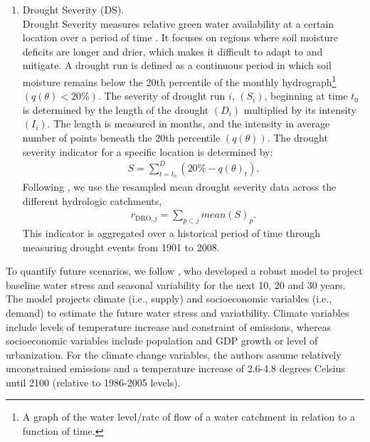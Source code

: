 \documentclass[a4paper]{article}
\begin{document}
\begin{enumerate}
\item Drought Severity (DS).\\
Drought Severity measures relative green water availability at a certain location over a period of time \citep{Schyns:2015}.
It focuses on regions where soil moisture deficits are longer and drier, which makes it difficult to adapt to and mitigate. 
A drought run is defined as a continuous period in which soil moisture remains below the 20th percentile of the monthly hydrograph\footnote{A graph of the water level/rate of flow of a water catchment in relation to a function of time.} $(q(\theta)<20\%)$. The severity of drought run $i$, $(S_i)$, beginning at time $t_0$ is determined by the length of the drought $(D_i)$ multiplied by its intensity $(I_i)$.
The length is measured in months, and the intensity in average number of points beneath the 20th percentile $(q(\theta))$. 
The drought severity indicator for a specific location is determined by:
\begin{align}
S= \sum_{t=t_0}^{D} (20\%-q(\theta)_t).
\end{align}
Following \citet{Gassert:2014}, we use the resampled mean drought severity data across the different hydrologic catchments, 
\begin{align}
r_{\mathrm{DRO},j}=\sum_{p\subset j} \mathit{mean}(S)_p.
\end{align}
This indicator is aggregated over a historical period of time through measuring drought events from 1901 to 2008. 
\end{enumerate}

To quantify future scenarios, we follow \citet{Luck:2015}, who developed a robust model to project baseline water stress and seasonal variability for the next 10, 20 and 30 years.
The model projects climate (i.e., supply) and socioeconomic variables (i.e., demand) to estimate the future water stress and variatbility. 
Climate variables include levels of temperature increase and constraint of emissions, whereas socioeconomic variables include population and GDP growth or level of urbanization. 
For the climate change variables, the authors assume relatively unconstrained emissions and a temperature increase of 2.6-4.8 degrees Celsius until 2100 (relative to 1986-2005 levels).
\end{document}
